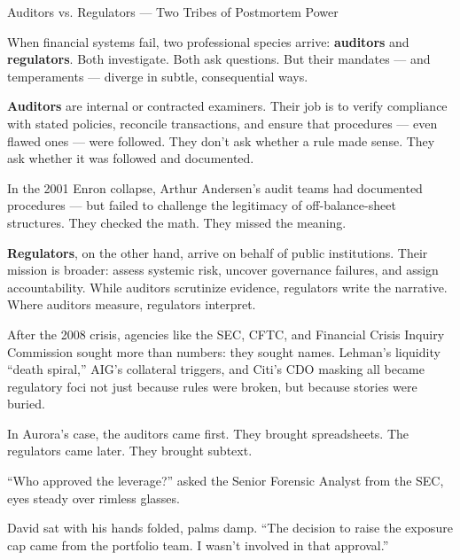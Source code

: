 \begin{HistoricalSidebar}{Auditors vs. Regulators — Two Tribes of Postmortem Power}

  When financial systems fail, two professional species arrive: \textbf{auditors} and \textbf{regulators}. 
  Both investigate. Both ask questions. But their mandates — and temperaments — diverge in subtle, consequential ways.

  \medskip
  
  \textbf{Auditors} are internal or contracted examiners. Their job is to verify compliance with stated policies, 
  reconcile transactions, and ensure that procedures — even flawed ones — were followed. They don’t ask whether a 
  rule made sense. They ask whether it was followed and documented.

  \medskip
  
  In the 2001 Enron collapse, Arthur Andersen’s audit teams had documented procedures — but failed to challenge 
  the legitimacy of off-balance-sheet structures. They checked the math. They missed the meaning.

  \medskip
  
  \textbf{Regulators}, on the other hand, arrive on behalf of public institutions. Their mission is broader: 
  assess systemic risk, uncover governance failures, and assign accountability. While auditors scrutinize evidence, 
  regulators write the narrative. Where auditors measure, regulators interpret.

  \medskip
  
  After the 2008 crisis, agencies like the SEC, CFTC, and Financial Crisis Inquiry Commission sought more than numbers: 
  they sought names. Lehman’s liquidity “death spiral,” AIG’s collateral triggers, and Citi’s CDO masking all became 
  regulatory foci not just because rules were broken, but because stories were buried.

  \medskip
  
  In Aurora’s case, the auditors came first. They brought spreadsheets.  
  The regulators came later. They brought subtext.
  
\end{HistoricalSidebar}

\medskip




``Who approved the leverage?'' asked the Senior Forensic Analyst from the SEC, eyes steady over rimless glasses.

David sat with his hands folded, palms damp. ``The decision to raise the exposure cap came from the portfolio team. 
I wasn’t involved in that approval.''

